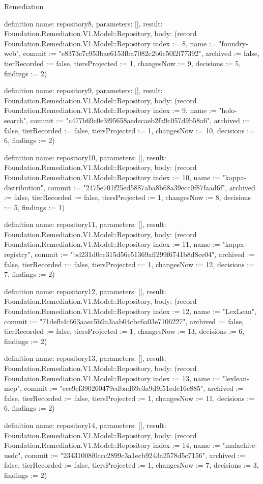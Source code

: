 \begin{lexlean}{Remediation}
\begin{semanticmodule}
definition{
  name: repository8,
  parameters: [],
  result: Foundation.Remediation.V1.Model::Repository,
  body: (record Foundation.Remediation.V1.Model::Repository {index := 8, name := "foundry-web", commit := "e8373c7c953bae6153fba7082c2b6c50f2f77392", archived := false, tierRecorded := false, tiersProjected := 1, changesNow := 9, decisions := 5, findings := 2})
}

definition{
  name: repository9,
  parameters: [],
  result: Foundation.Remediation.V1.Model::Repository,
  body: (record Foundation.Remediation.V1.Model::Repository {index := 9, name := "holo-search", commit := "c477b69c0e3f95658aedecaeb2fa9c057d9b58a6", archived := false, tierRecorded := false, tiersProjected := 1, changesNow := 10, decisions := 6, findings := 2})
}

definition{
  name: repository10,
  parameters: [],
  result: Foundation.Remediation.V1.Model::Repository,
  body: (record Foundation.Remediation.V1.Model::Repository {index := 10, name := "kappa-distribution", commit := "2475e701f25ed5887aba8b68a39ecc0f87faad6f", archived := false, tierRecorded := false, tiersProjected := 1, changesNow := 8, decisions := 5, findings := 1})
}

definition{
  name: repository11,
  parameters: [],
  result: Foundation.Remediation.V1.Model::Repository,
  body: (record Foundation.Remediation.V1.Model::Repository {index := 11, name := "kappa-registry", commit := "bd231d0cc315d56e51369aff299f6741b8d8ce04", archived := false, tierRecorded := false, tiersProjected := 1, changesNow := 12, decisions := 7, findings := 2})
}

definition{
  name: repository12,
  parameters: [],
  result: Foundation.Remediation.V1.Model::Repository,
  body: (record Foundation.Remediation.V1.Model::Repository {index := 12, name := "LexLean", commit := "71defb4c663aaec5b9a3aab04cbc6a03e7106227", archived := false, tierRecorded := false, tiersProjected := 1, changesNow := 13, decisions := 6, findings := 2})
}

definition{
  name: repository13,
  parameters: [],
  result: Foundation.Remediation.V1.Model::Repository,
  body: (record Foundation.Remediation.V1.Model::Repository {index := 13, name := "lexlean-mcp", commit := "ece9ef390260479edbad69c3a9d9f51edc16c885", archived := false, tierRecorded := false, tiersProjected := 1, changesNow := 11, decisions := 6, findings := 2})
}

definition{
  name: repository14,
  parameters: [],
  result: Foundation.Remediation.V1.Model::Repository,
  body: (record Foundation.Remediation.V1.Model::Repository {index := 14, name := "malachite-usdc", commit := "23431008f0ccc2899c3a1ecb9243a2578d5c7156", archived := false, tierRecorded := false, tiersProjected := 1, changesNow := 7, decisions := 3, findings := 2})
}


\end{semanticmodule}
\end{lexlean}
